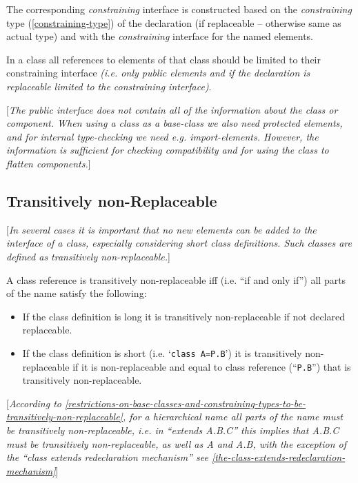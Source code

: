 The corresponding \emph{constraining} interface is constructed based on
the \emph{constraining} type (\autoref{constraining-type}) of the declaration (if
replaceable -- otherwise same as actual type) and with the
\emph{constraining} interface for the named elements.

In a class all references to elements of that class should be limited to
their constraining interface \emph{(i.e. only public elements and if the
declaration is replaceable limited to the constraining interface)}.

{[}\emph{The public interface does not contain all of the information
about the class or component. When using a class as a base-class we also
need protected elements, and for internal type-checking we need e.g.
import-elements. However, the information is sufficient for checking
compatibility and for using the class to flatten components.}{]}

\subsection{Transitively non-Replaceable}

{[}\emph{In several cases it is important that no new elements can be
added to the interface of a class, especially considering short class
definitions. Such classes are defined as transitively
non-replaceable.}{]}

A class reference is transitively non-replaceable iff (i.e. ``if and
only if'') all parts of the name satisfy the following:

\begin{itemize}
\item
  If the class definition is long it is transitively non-replaceable if
  not declared replaceable.
\item
  If the class definition is short (i.e. `\lstinline[basicstyle=\ttfamily]!class A=P.B!') it is
  transitively non-replaceable if it is non-replaceable and equal to
  class reference (``\lstinline[basicstyle=\ttfamily]!P.B!'') that is transitively non-replaceable.
\end{itemize}

{[}\emph{According to \autoref{restrictions-on-base-classes-and-constraining-types-to-be-transitively-non-replaceable}, for a hierarchical name all
parts of the name must be transitively non-replaceable, i.e. in
``extends A.B.C'' this implies that A.B.C must be transitively
non-replaceable, as well as A and A.B, with the exception of the ``class
extends redeclaration mechanism'' see \autoref{the-class-extends-redeclaration-mechanism}}{]}

